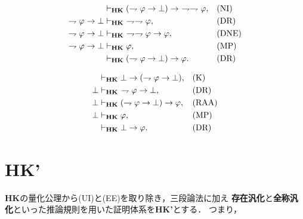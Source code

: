 	\begin{sketch}[RAA]
		\begin{align}
			&\provable{\mbox{{\bf HK}}} (\rightharpoondown \varphi \rightarrow \bot) \rightarrow\ 
				\rightharpoondown \rightharpoondown \varphi, && \mbox{(NI)} \\
			\rightharpoondown \varphi \rightarrow \bot &\provable{\mbox{{\bf HK}}}\ 
				\rightharpoondown \rightharpoondown \varphi, && \mbox{(DR)} \\
			\rightharpoondown \varphi \rightarrow \bot &\provable{\mbox{{\bf HK}}}\ 
				\rightharpoondown \rightharpoondown \varphi \rightarrow \varphi, && \mbox{(DNE)} \\
			\rightharpoondown \varphi \rightarrow \bot &\provable{\mbox{{\bf HK}}} \varphi, && \mbox{(MP)} \\
			&\provable{\mbox{{\bf HK}}} (\rightharpoondown \varphi \rightarrow \bot) \rightarrow \varphi. && \mbox{(DR)}
		\end{align}
		\QED
	\end{sketch}
	
	\begin{sketch}[EFQ]
		\begin{align}
			&\vdash_{{\scriptsize \mbox{{\bf HK}}}} \bot \rightarrow (\rightharpoondown \varphi \rightarrow \bot), && \mbox{(K)} \\
			\bot &\vdash_{{\scriptsize \mbox{{\bf HK}}}}\ \rightharpoondown \varphi \rightarrow \bot, && \mbox{(DR)} \\
			\bot &\vdash_{{\scriptsize \mbox{{\bf HK}}}} (\rightharpoondown \varphi \rightarrow \bot) \rightarrow \varphi,
				&& \mbox{(RAA)} \\
			\bot &\vdash_{{\scriptsize \mbox{{\bf HK}}}} \varphi, && \mbox{(MP)} \\
			&\vdash_{{\scriptsize \mbox{{\bf HK}}}} \bot \rightarrow \varphi. && \mbox{(DR)}
		\end{align}
		\QED
	\end{sketch}
	
\section{{\bf HK'}}
	{\bf HK}の量化公理から(UI)と(EE)を取り除き，三段論法に加え
	{\bf 存在汎化}と{\bf 全称汎化}といった推論規則を用いた証明体系を{\bf HK'}とする．
	つまり，
	
